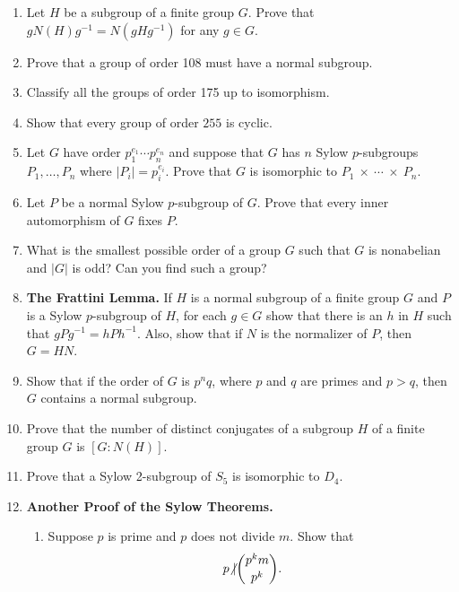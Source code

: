 {\begin{enumerate}
\item
Let $H$ be a subgroup of a finite group $G$. Prove that $g N(H) g^{-1}
= N(gHg^{-1})$ for any $g \in G$. 

\item
Prove that a group of order 108 must have a normal subgroup.

\item
Classify all the groups of order 175 up to isomorphism.

\item
Show that every group of order $255$ is cyclic.

\item
Let $G$ have order $p_1^{e_1} \cdots p_n^{e_n}$ and suppose that $G$
has $n$ Sylow \mbox{$p$-subgroups} $P_1, \ldots, P_n$ where 
$|P_i| = p_i^{e_i}$.  Prove that $G$ is isomorphic to 
$P_1~\times~\cdots~\times~P_n$. 
 
\item
Let $P$ be a normal Sylow $p$-subgroup of $G$.  Prove that every inner
automorphism of $G$ fixes $P$.  
 
 
\item
What is the smallest possible order of a group $G$ such that $G$ is
nonabelian and $|G|$ is odd?  Can you find such a group?
 
 
\item
{\bf The Frattini Lemma.}  
If $H$ is a normal subgroup of a finite group $G$ and $P$ is a Sylow
$p$-subgroup of $H$, for each $g \in G$ show that there is an $h$ in
$H$ such that $gPg^{-1} = hPh^{-1}$.  Also, show that if $N$ is the
normalizer of $P$, then $G= HN$. 
 
 
\item
Show that if the order of $G$ is $p^nq$, where $p$ and $q$ are primes
and $p>q$, then $G$ contains a normal subgroup. 
 
 
\item
Prove that the number of distinct conjugates of a subgroup $H$ of a 
finite group $G$ is $[G : N(H) ]$. 
 
 
\item
Prove that a Sylow 2-subgroup of $S_5$ is isomorphic to $D_4$.
 
 
\item
{\bf Another Proof of the Sylow Theorems.}
\begin{enumerate}
 
\item
Suppose $p$ is prime and $p$ does not divide $m$.  Show that
\[
p {\not{\mid}}
\binom{p^k m}{p^k}.
\]
 

\end{enumerate}
\end{enumerate}}
